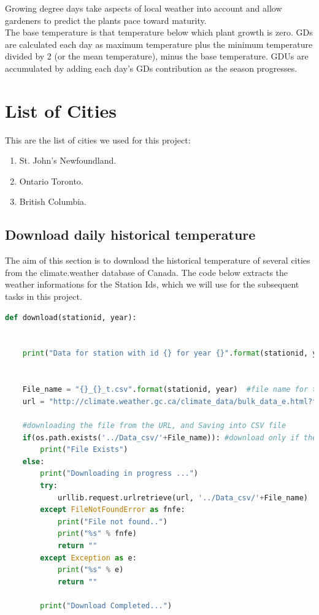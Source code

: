 Growing degree days take aspects of local weather into account and allow gardeners to predict the plants pace toward maturity.\\

The base temperature is that temperature below which plant growth is zero. GDs are calculated each day as maximum temperature plus the minimum temperature divided by 2 (or the mean temperature), minus the base temperature. GDUs are accumulated by adding each day’s GDs contribution as the season progresses.


\section{List of Cities }
This are the list of cities we used for this project:
\begin{enumerate}
\item St. John's Newfoundland.
\item Ontario Toronto.
\item British Columbia.
\end{enumerate}
\label{sec:examples}

\subsection{Download daily historical temperature}
The aim of this section is to download the historical temperature of several cities from the climate.weather database of Canada. The code below extracts the weather informations for the Station Ids, which we will use for the subsequent tasks in this project.   

\begin{lstlisting}[language=Python]
def download(stationid, year):
    
    
    print("Data for station with id {} for year {}".format(stationid, year))
    
    
    File_name = "{}_{}_t.csv".format(stationid, year)  #file name for the CSV
    url = "http://climate.weather.gc.ca/climate_data/bulk_data_e.html?format=csv&stationID="+str(stationid)+"&Year="+str(year)+"&Month=8&Day=1&timeframe=2&submit=Download+Data"

    #downloading the file from the URL, and Saving into CSV file
    if(os.path.exists('../Data_csv/'+File_name)): #download only if the file not Exists
        print("File Exists")
    else:
        print("Downloading in progress ...")
        try:
            urllib.request.urlretrieve(url, '../Data_csv/'+File_name)
        except FileNotFoundError as fnfe:
            print("File not found..")
            print("%s" % fnfe)
            return ""
        except Exception as e:
            print("%s" % e)
            return ""
            
        print("Download Completed...")
        
\end{lstlisting}


